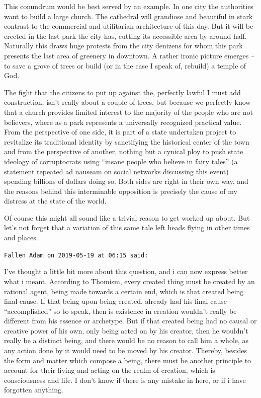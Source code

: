 \begin{footnotesize}
\begin{sffamily}
This conundrum would be best served by an example. In one city the authorities want to build a large church. The cathedral will grandiose and beautiful in stark contrast to the commercial and utilitarian architecture of this day. But it will be erected in the last park the city has, cutting its accessible area by around half. Naturally this draws huge protests from the city denizens for whom this park presents the last area of greenery in downtown. A rather ironic picture emerges -- to save a grove of trees or build (or in the case I speak of, rebuild) a temple of God.

The fight that the citizens to put up against the, perfectly lawful I must add construction, isn't really about a couple of trees, but because we perfectly know that a church provides limited interest to the majority of the people who are not believers, where as a park represents a universally recognized practical value. From the perspective of one side, it is part of a state undertaken project to revitalize its traditional identity by sanctifying the historical center of the town and from the perspective of another, nothing but a cynical ploy to push state ideology of corruptocrats using ``insane people who believe in fairy tales'' (a statement repeated ad nauseam on social networks discussing this event) spending billions of dollars doing so. Both sides are right in their own way, and the reasons behind this interminable opposition is precisely the cause of my distress at the state of the world.

Of course this might all sound like a trivial reason to get worked up about. But let's not forget that a variation of this same tale left heads flying in other times and places.

\hfill

\texttt{Fallen Adam on 2019-05-19 at 06:15 said:}

I've thought a little bit more about this question, and i can now express better what i meant. According to Thomism, every created thing must be created by an rational agent, being made towards a certain end, which is that created being final cause. If that being upon being created, already had his final cause ``accomplished'' so to speak, then is existence in creation wouldn't really be different from his essence or archetype. But if that created being had no causal or creative power of his own, only being acted on by his creator, then he wouldn't really be a distinct being, and there would be no reason to call him a whole, as any action done by it would need to be moved by his creator. Thereby, besides the form and matter which compose a being, there must be another principle to account for their living and acting on the realm of creation, which is consciousness and life. I don't know if there is any mistake in here, or if i have forgotten anything.


\end{sffamily}
\end{footnotesize}
